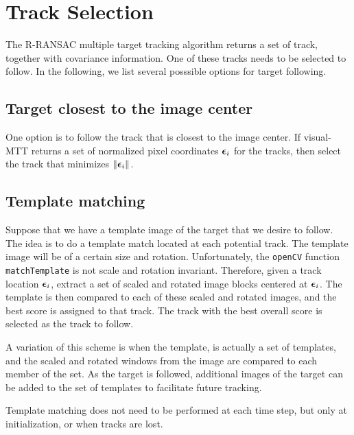 


\section{Track Selection}
\label{sec:track_selection}

The R-RANSAC multiple target tracking algorithm returns a set of track, together with covariance information.  One of these tracks needs to be selected to follow.  In the following, we list several posssible options for target following.

\subsection{Target closest to the image center}
One option is to follow the track that is closest to the image center.  If visual-MTT returns a set of normalized pixel coordinates $\boldsymbol{\epsilon}_i$ for the tracks, then select the track that minimizes $\left\|\boldsymbol{\epsilon}_i\right\|$.

\subsection{Template matching}
Suppose that we have a template image of the target that we desire to follow.  The idea is to do a template match located at each potential track.
The template image will be of a certain size and rotation.  Unfortunately, the \texttt{openCV} function \texttt{matchTemplate} is not scale and rotation invariant.  Therefore, given a track location $\boldsymbol{\epsilon}_i$, extract a set of scaled and rotated image blocks centered at $\boldsymbol{\epsilon}_i$.  The template is then compared to each of these scaled and rotated images, and the best score is assigned to that track.  The track with the best overall score is selected as the track to follow.

A variation of this scheme is when the template, is actually a set of templates, and the scaled and rotated windows from the image are compared to each member of the set.  As the target is followed, additional images of the target can be added to the set of templates to facilitate future tracking.  

Template matching does not need to be performed at each time step, but only at initialization, or when tracks are lost.

